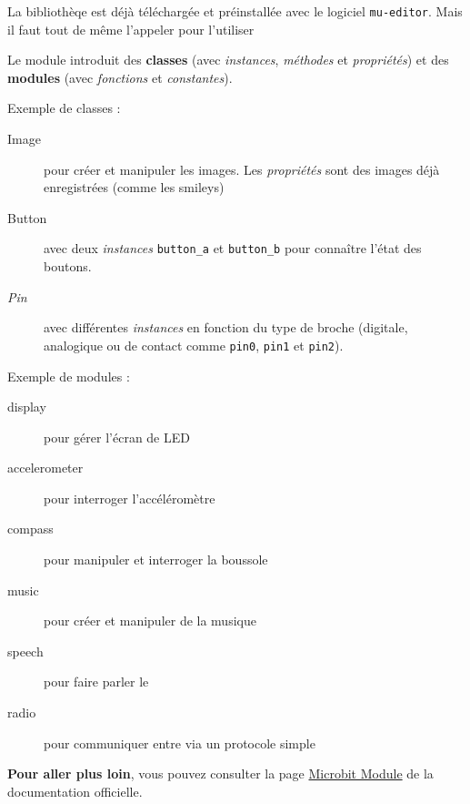     
\begin{methode}
\end{methode}

\begin{astuce}
La bibliothèqe  est déjà téléchargée et préinstallée avec le logiciel \texttt{mu-editor}. Mais il faut tout de même l'appeler pour l'utiliser
\end{astuce}

Le module  introduit des \textbf{classes} (avec \emph{instances}, \emph{méthodes} et \emph{propriétés}) et des \textbf{modules} (avec \emph{fonctions} et  \emph{constantes}).

\begin{minipage}[t]{0.5\linewidth}
    Exemple de classes :
    \begin{description}
        \item[Image] pour créer et manipuler les images. Les \emph{propriétés} sont des images déjà enregistrées (comme les smileys)
        \item[Button] avec deux \emph{instances} \texttt{button\_a} et \texttt{button\_b} pour connaître l'état des boutons. 
        \item[\textit{Pin}] avec différentes \emph{instances} en fonction du type de broche (digitale, analogique ou de contact comme \texttt{pin0},  \texttt{pin1} et  \texttt{pin2}).
    \end{description}
\end{minipage}
%
\begin{minipage}[t]{0.5\linewidth}
    Exemple de modules :
    \begin{description}
        \item[display] pour gérer l'écran de LED
        \item[accelerometer] pour interroger l'accéléromètre
        \item[compass] pour manipuler et interroger la boussole
        \item[music] pour créer et manipuler de la musique
        \item[speech] pour faire parler le \mb
        \item[radio] pour communiquer entre \mb via un protocole simple
    \end{description}
\end{minipage}

\begin{remarque}
\textbf{Pour aller plus loin}, vous pouvez consulter la page  \href{https://microbit-micropython.readthedocs.io/fr/latest/microbit.html}{Microbit Module} de la documentation officielle.
\end{remarque}


